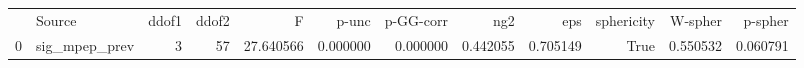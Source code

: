 \begin{tabular}{llrrrrrrrrrr}
 & Source & ddof1 & ddof2 & F & p-unc & p-GG-corr & ng2 & eps & sphericity & W-spher & p-spher \\
0 & sig_mpep_prev & 3 & 57 & 27.640566 & 0.000000 & 0.000000 & 0.442055 & 0.705149 & True & 0.550532 & 0.060791 \\
\end{tabular}

